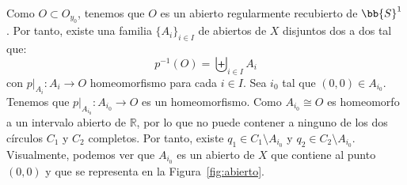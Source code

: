 \documentclass[12pt]{article}
\begin{document}
\begin{ejercicio}
\begin{enumerate}[label=\alph*)]
\begin{description}
                    Como $O\subset O_{y_0}$, tenemos que $O$ es un abierto regularmente recubierto de $\bb{S}^1$. Por tanto, existe una familia $\{A_i\}_{i\in I}$ de abiertos de $X$ disjuntos dos a dos tal que:
                    \begin{equation*}
                        p^{-1}(O) = \biguplus_{i\in I} A_i
                    \end{equation*}
                    con $p\big|_{A_i}:A_i\to O$ homeomorfismo para cada $i\in I$. Sea $i_0$ tal que $(0,0)\in A_{i_0}$. Tenemos que $p\big|_{A_{i_0}}:A_{i_0}\to O$ es un homeomorfismo. Como $A_{i_0}\cong O$ es homeomorfo a un intervalo abierto de $\mathbb{R}$, por lo que no puede contener a ninguno de los dos círculos $C_1$ y $C_2$ completos. Por tanto, existe $q_1\in C_1\setminus A_{i_0}$ y $q_2\in C_2\setminus A_{i_0}$. Visualmente, podemos ver que $A_{i_0}$ es un abierto de $X$ que contiene al punto $(0,0)$ y que se representa en la Figura~\ref{fig:abierto}.
                    \begin{figure}[h]
                        \centering
\end{figure}
\end{description}
\end{enumerate}
\end{ejercicio}
\end{document}
